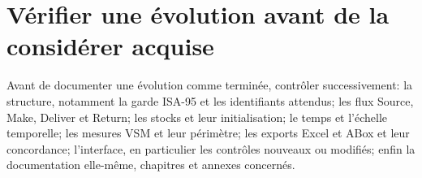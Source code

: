 \section{Vérifier une évolution avant de la considérer acquise}

Avant de documenter une évolution comme terminée, contrôler successivement: la structure, notamment la garde ISA-95 et les identifiants attendus; les flux Source, Make, Deliver et Return; les stocks et leur initialisation; le temps et l'échelle temporelle; les mesures VSM et leur périmètre; les exports Excel et ABox et leur concordance; l'interface, en particulier les contrôles nouveaux ou modifiés; enfin la documentation elle-même, chapitres et annexes concernés.

